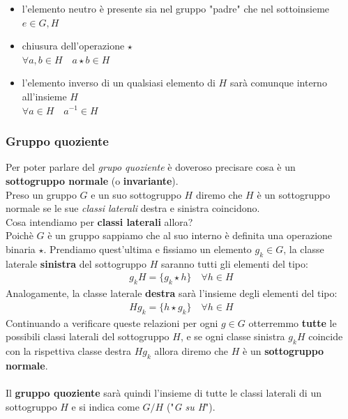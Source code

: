 \begin{itemize}
  \item l'elemento neutro è presente sia nel gruppo "padre" che nel sottoinsieme \\ 
  \(e \in G, H\)

  \item chiusura dell'operazione \(\star\) \\
  \(\forall a,b \in H \quad a \star b \in H\)

  \item l'elemento inverso di un qualsiasi elemento di \(H\) sarà
  comunque interno all'insieme \(H\) \\
  \( \forall a \in H \quad a^{-1} \in H\)
  
\end{itemize}

\subsubsection{Gruppo quoziente}
Per poter parlare del \emph{grupo quoziente} è doveroso precisare cosa è
un \textbf{sottogruppo normale} (o \textbf{invariante}). \\
Preso un gruppo \(G\) e un suo sottogruppo \(H\) diremo che \(H\) è un 
sottogruppo normale se le sue \emph{classi laterali} destra e sinistra coincidono. \\
Cosa intendiamo per \textbf{classi laterali} allora? \\
Poichè \(G\) è un gruppo sappiamo che al suo interno è definita una 
operazione binaria \(\star\). Prendiamo quest'ultima e fissiamo un elemento 
\(g_k \in G\), la classe laterale \textbf{sinistra} del sottogruppo \(H\) saranno tutti
gli elementi del tipo:
\begin{align*}
  g_kH = \{ g_k \star h \} \quad \forall h \in H
\end{align*}
Analogamente, la classe laterale \textbf{destra} sarà l'insieme degli elementi
del tipo:
\begin{align*}
  Hg_k = \{ h \star g_k \} \quad \forall h \in H
\end{align*}
Continuando a verificare queste relazioni per ogni \(g \in G\)
otterremmo \textbf{tutte} le possibili classi laterali del sottogruppo \(H\),
e se ogni classe sinistra \(g_kH\) coincide con la rispettiva classe destra
\(Hg_k\) allora diremo che \(H\) è un \textbf{sottogruppo normale}.
\\
\\
Il \textbf{gruppo quoziente} sarà quindi l'insieme di tutte le classi 
laterali di un sottogruppo \(H\) e si indica come \(G/H\) ("\emph{G su H}").

